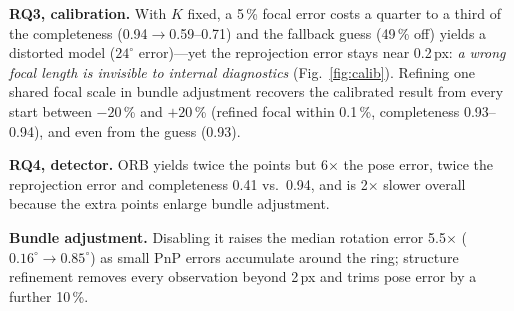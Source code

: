 \documentclass[conference,11pt]{IEEEtran}
\begin{document}
\textbf{RQ3, calibration.} With $K$ fixed, a 5\,\% focal error costs a quarter to a third of the completeness (0.94$\rightarrow$0.59--0.71) and the fallback guess (49\,\% off) yields a distorted model ($24^\circ$ error)---yet the reprojection error stays near 0.2\,px: \emph{a wrong focal length is invisible to internal diagnostics} (Fig.~\ref{fig:calib}). Refining one shared focal scale in bundle adjustment recovers the calibrated result from every start between $-20$\,\% and $+20$\,\% (refined focal within 0.1\,\%, completeness 0.93--0.94), and even from the guess (0.93).

\textbf{RQ4, detector.} ORB yields twice the points but 6$\times$ the pose error, twice the reprojection error and completeness 0.41 vs.\ 0.94, and is 2$\times$ slower overall because the extra points enlarge bundle adjustment.

\textbf{Bundle adjustment.} Disabling it raises the median rotation error 5.5$\times$ ($0.16^\circ\rightarrow0.85^\circ$) as small PnP errors accumulate around the ring; structure refinement removes every observation beyond 2\,px and trims pose error by a further 10\,\%.

\begin{table}[t]
\caption{Ablations on templeRing (47 images)}
\label{tab:ablation}
\centering
\setlength{\tabcolsep}{3pt}
\end{table}
\end{document}
